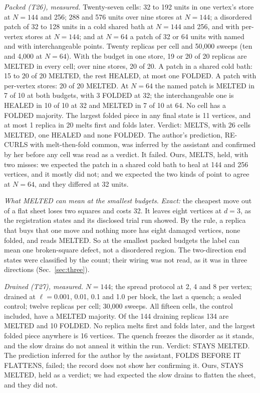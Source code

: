 \documentclass[aps,pre,10pt,twocolumn,superscriptaddress,nofootinbib]{revtex4-2}
\begin{document}
\emph{Packed (T26), measured.} Twenty-seven cells: 32 to 192 units in one vertex's store at $N = 144$ and 256; 288
and 576 units over nine stores at $N = 144$; a disordered patch of 32 to 128 units in a cold shared bath at $N =
144$ and 256, and with per-vertex stores at $N = 144$; and at $N = 64$ a patch of 32 or 64 units with named and with
interchangeable points. Twenty replicas per cell and 50,000 sweeps (ten and 4,000 at $N = 64$). With the budget in
one store, 19 or 20 of 20 replicas are MELTED in every cell; over nine stores, 20 of 20. A patch in a shared cold
bath: 15 to 20 of 20 MELTED, the rest HEALED, at most one FOLDED. A patch with per-vertex stores: 20 of 20 MELTED.
At $N = 64$ the named patch is MELTED in 7 of 10 at both budgets, with 3 FOLDED at 32; the interchangeable one is
HEALED in 10 of 10 at 32 and MELTED in 7 of 10 at 64. No cell has a FOLDED majority. The largest folded piece in any
final state is 11 vertices, and at most 1 replica in 20 melts first and folds later. Verdict: MELTS, with 26 cells
MELTED, one HEALED and none FOLDED. The author's prediction, RE-CURLS with melt-then-fold common, was inferred by
the assistant and confirmed by her before any cell was read as a verdict. It failed. Ours, MELTS, held, with two
misses: we expected the patch in a shared cold bath to heal at 144 and 256 vertices, and it mostly did not; and we
expected the two kinds of point to agree at $N = 64$, and they differed at 32 units.

\emph{What MELTED can mean at the smallest budgets.} \emph{Exact:} the cheapest move out of a flat sheet loses two
squares and costs 32. It leaves eight vertices at $d = 3$, as the registration states and its disclosed trial run
showed. By the rule, a replica that buys that one move and nothing more has eight damaged vertices, none folded,
and reads MELTED. So at the smallest packed budgets the label can mean one broken-square defect, not a disordered
region. The two-direction end states were classified by the count; their wiring was not read, as it was in three
directions (Sec.~\ref{sec:three}).

\emph{Drained (T27), measured.} $N = 144$; the spread protocol at 2, 4 and 8 per vertex; drained at
$\ell = 0.001$, 0.01, 0.1 and 1.0 per block, the last a quench; a sealed control; twelve replicas per cell; 30,000
sweeps. All fifteen cells, the control included, have a MELTED majority. Of the 144 draining replicas 134 are MELTED
and 10 FOLDED. No replica melts first and folds later, and the largest folded piece anywhere is 16 vertices. The
quench freezes the disorder as it stands, and the slow drains do not anneal it within the run. Verdict: STAYS MELTED.
The prediction inferred for the author by the assistant, FOLDS BEFORE IT FLATTENS, failed; the record does not
show her confirming it. Ours, STAYS MELTED, held as a verdict; we had expected the slow drains to flatten the
sheet, and they did not.
\end{document}
